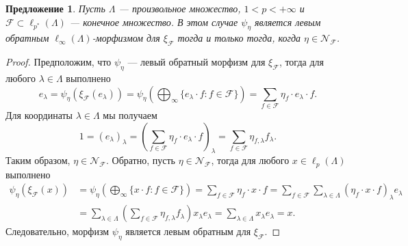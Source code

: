 \documentclass[12pt]{article}
\newtheorem{proposition}[theorem]{Предложение}
\begin{document}
\begin{proposition}\label{StdEmbdLeftInvCharac}
    Пусть $\Lambda$ --- произвольное множество, $1<p<+\infty$ 
    и $\mathcal{F}\subset\ell_{p^*}(\Lambda)$ --- 
    конечное множество. В этом случае $\psi_\eta$ является левым 
    обратным $\ell_\infty(\Lambda)$-морфизмом для $\xi_{\mathcal{F}}$ тогда и 
    только тогда, когда $\eta\in\mathcal{N}_{\mathcal{F}}$.
\end{proposition}
\begin{proof} 
    Предположим, что $\psi_{\eta}$ --- левый обратный морфизм 
    для $\xi_{\mathcal{F}}$, тогда для любого $\lambda\in\Lambda$ выполнено
    \[
        e_\lambda
        =\psi_{\eta}(\xi_{\mathcal{F}}(e_\lambda))
        =\psi_{\eta}\left(\bigoplus_\infty\{
            e_\lambda\cdot f: f\in\mathcal{F}
        \}\right)
        =\sum_{f\in\mathcal{F}} \eta_{f}\cdot e_\lambda\cdot f.
    \]
    Для координаты $\lambda\in\Lambda$ мы получаем
    \[
        1=(e_\lambda)_\lambda
        =\left(
            \sum_{f\in\mathcal{F}} \eta_f\cdot e_\lambda\cdot f
        \right)_\lambda
        =\sum_{f\in\mathcal{F}} \eta_{f,\lambda}f_\lambda.
    \]
    Таким образом, $\eta\in\mathcal{N}_{\mathcal{F}}$.
    Обратно, пусть $\eta\in\mathcal{N}_{\mathcal{F}}$, тогда для 
    любого $x\in\ell_p(\Lambda)$ выполнено
    \[
    \begin{aligned}
        \psi_\eta(\xi_{\mathcal{F}}(x))
        &=\psi_{\eta}\left(\bigoplus_\infty\{x\cdot f:f\in\mathcal{F}\}\right) 
        =\sum_{f\in\mathcal{F}}\eta_f\cdot x\cdot f 
        =\sum_{f\in\mathcal{F}}\sum_{\lambda\in\Lambda} 
            (\eta_f\cdot x\cdot f)_\lambda e_\lambda \\
        &=\sum_{\lambda\in\Lambda} 
            \left(\sum_{f\in\mathcal{F}}\eta_{f,\lambda}f_\lambda\right) 
            x_\lambda e_\lambda 
        =\sum_{\lambda\in\Lambda} x_\lambda e_\lambda 
        =x. 
    \end{aligned}
    \]
    Следовательно, морфизм $\psi_\eta$ является левым обратным 
    для $\xi_{\mathcal{F}}$.
\end{proof}
\end{document}
